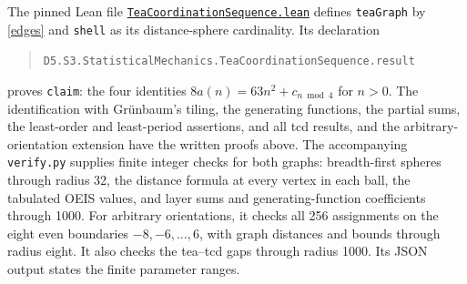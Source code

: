 \documentclass[11pt]{article}
\begin{document}
\medskip
The pinned Lean file
\href{https://github.com/the-omega-institute/trureturing/blob/e7f7c25c7de35e89418be730f50ec8fb94949133/D5/S3/StatisticalMechanics/TeaCoordinationSequence.lean}{\texttt{TeaCoordinationSequence.lean}}
defines \texttt{teaGraph} by \eqref{edges} and \texttt{shell} as its
distance-sphere cardinality. Its declaration
\begin{quote}\small
\texttt{D5.S3.StatisticalMechanics.TeaCoordinationSequence.result}
\end{quote}
proves \texttt{claim}: the four identities
$8a(n)=63n^2+c_{n\bmod4}$ for $n>0$.
The identification with Gr\"unbaum's tiling, the generating functions,
the partial sums, the least-order and least-period assertions, and all tcd
results, and the arbitrary-orientation extension have the written proofs above.
The accompanying \texttt{verify.py} supplies
finite integer checks for both graphs: breadth-first spheres through radius 32,
the distance formula at every vertex in each ball, the tabulated OEIS
values, and layer sums and generating-function coefficients through 1000.
For arbitrary orientations, it checks all 256 assignments on the eight even
boundaries $-8,-6,\ldots,6$, with graph distances and bounds through radius
eight. It also checks the tea--tcd gaps through radius 1000.
Its JSON output states the finite parameter ranges.
\end{document}
